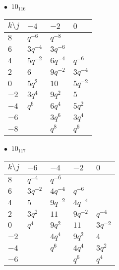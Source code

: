 \begin{minipage}{\linewidth}
$\bullet\ $ $10_{116}$ \vspace{0.5em} \\
\begin{tabular}{l|lll}
$k \setminus j$ & $-4$ & $-2$ & $0$ \\
\hline
$8$ & $q^{-6}$ & $q^{-8}$ &  \\
$6$ & $3q^{-4}$ & $3q^{-6}$ &  \\
$4$ & $5q^{-2}$ & $6q^{-4}$ & $q^{-6}$ \\
$2$ & $6$ & $9q^{-2}$ & $3q^{-4}$ \\
$0$ & $5q^{2}$ & $10$ & $5q^{-2}$ \\
$-2$ & $3q^{4}$ & $9q^{2}$ & $5$ \\
$-4$ & $q^{6}$ & $6q^{4}$ & $5q^{2}$ \\
$-6$ &  & $3q^{6}$ & $3q^{4}$ \\
$-8$ &  & $q^{8}$ & $q^{6}$ \\
\end{tabular}
\vspace{2em}
\end{minipage}
%
\begin{minipage}{\linewidth}
$\bullet\ $ $10_{117}$ \vspace{0.5em} \\
\begin{tabular}{l|llll}
$k \setminus j$ & $-6$ & $-4$ & $-2$ & $0$ \\
\hline
$8$ & $q^{-4}$ & $q^{-6}$ &  &  \\
$6$ & $3q^{-2}$ & $4q^{-4}$ & $q^{-6}$ &  \\
$4$ & $5$ & $9q^{-2}$ & $4q^{-4}$ &  \\
$2$ & $3q^{2}$ & $11$ & $9q^{-2}$ & $q^{-4}$ \\
$0$ & $q^{4}$ & $9q^{2}$ & $11$ & $3q^{-2}$ \\
$-2$ &  & $4q^{4}$ & $9q^{2}$ & $4$ \\
$-4$ &  & $q^{6}$ & $4q^{4}$ & $3q^{2}$ \\
$-6$ &  &  & $q^{6}$ & $q^{4}$ \\
\end{tabular}
\vspace{2em}
\end{minipage}
%
